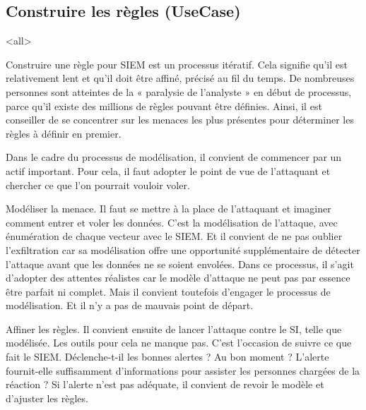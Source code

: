 \subsection{Construire les règles (UseCase)}




\mode<all>{}


Construire une règle pour SIEM est un processus itératif. Cela signifie qu’il est relativement lent et qu’il doit être affiné, précisé au fil du temps. De nombreuses personnes sont atteintes de la « paralysie de l’analyste » en début de processus, parce qu’il existe des millions de règles pouvant être définies. Ainsi, il est  conseiller de se concentrer sur les menaces les plus présentes pour déterminer les règles à définir en premier.

Dans le cadre du processus de modélisation, il convient de commencer par un actif important. Pour cela, il faut adopter le point de vue de l’attaquant et chercher ce que l’on pourrait vouloir voler.

Modéliser la menace. Il faut se mettre à la place de l’attaquant et imaginer comment entrer et voler les données. C’est la modélisation de l’attaque, avec énumération de chaque vecteur avec le SIEM. Et il convient de ne pas oublier l’exfiltration car sa modélisation offre une opportunité supplémentaire de détecter l’attaque avant que les données ne se soient envolées. Dans ce processus, il s’agit d’adopter des attentes réalistes car le modèle d’attaque ne peut pas par essence être parfait ni complet. Mais il convient toutefois d’engager le processus de modélisation. Et il n’y a pas de mauvais point de départ.

Affiner les règles. Il convient ensuite de lancer l’attaque contre le SI, telle que modélisée. Les outils pour cela ne manque pas. C’est l’occasion de suivre ce que fait le SIEM. Déclenche-t-il les bonnes alertes ? Au bon moment ? L’alerte fournit-elle suffisamment d’informations pour assister les personnes chargées de la réaction ? Si l’alerte n’est pas adéquate, il convient de revoir le modèle et d’ajuster les règles.

